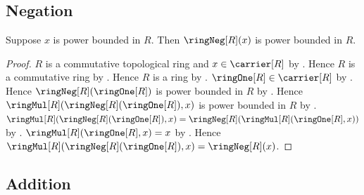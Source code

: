 \subsection{Negation}

\begin{theorem}\label{power_bounded_element_negation}
    Suppose $x$ is power bounded in $R$.
    Then $\ringNeg[R](x)$ is power bounded in $R$.
\end{theorem}
\begin{proof}
    $R$ is a commutative topological ring and $x\in\carrier[R]$ by
        .
    Hence $R$ is a commutative ring by
        .
    Hence $R$ is a ring by .
    $\ringOne[R]\in\carrier[R]$ by .
    Hence $\ringNeg[R](\ringOne[R])$ is power bounded in $R$ by
        .
    Hence $\ringMul[R](\ringNeg[R](\ringOne[R]),x)$ is power bounded in $R$
        by .
    $\ringMul[R](\ringNeg[R](\ringOne[R]),x)
        =\ringNeg[R](\ringMul[R](\ringOne[R],x))$ by
        .
    $\ringMul[R](\ringOne[R],x)=x$ by .
    Hence $\ringMul[R](\ringNeg[R](\ringOne[R]),x)
        =\ringNeg[R](x)$.
\end{proof}

\subsection{Addition}

